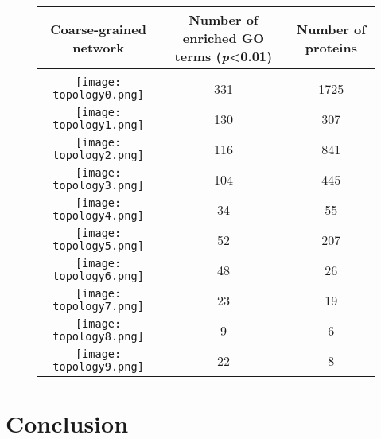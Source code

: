 \documentclass[a4paper,numbib, final, twoside, titelpage]{imaiai}%
\begin{document}
\begin{figure}[hb!]
\vspace{3em}
    \begin{tabular*}{\textwidth}{@{\extracolsep{\fill}}ccc} %
            Coarse-grained network & Number of enriched GO terms (\textit{p}\textless  0.01) & Number of proteins\\
    \hline\\
    \parbox[c]{1em}{\texttt{[image: topology0.png]} } & 331 & 1725 \\
    \parbox[c]{1em}{\texttt{[image: topology1.png]}} & 130 & 307 \\
    \parbox[c]{1em}{\texttt{[image: topology2.png]}}& 116 & 841 \\
    \parbox[c]{1em}{\texttt{[image: topology3.png]}}& 104 & 445 \\
    \parbox[c]{1em}{\texttt{[image: topology4.png]}}& 34 & 55 \\
    \parbox[c]{1em}{\texttt{[image: topology5.png]}}& 52 & 207 \\
    \parbox[c]{1em}{\texttt{[image: topology6.png]}}& 48 & 26 \\
    \parbox[c]{1em}{\texttt{[image: topology7.png]}}& 23 & 19 \\
    \parbox[c]{1em}{\texttt{[image: topology8.png]}}& 9 & 6 \\
    \parbox[c]{1em}{\texttt{[image: topology9.png]}}& 22 & 8 \\
    \end{tabular*} %
    \label{tab:singleChainTopology}
\end{figure}    

\newpage

\section{Conclusion}
\end{document}
